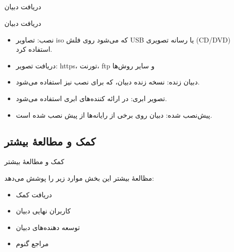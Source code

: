 \documentclass[hyperref={colorlinks}]{beamer}
\begin{document}
\begin{persian}
\section{}
\begin{frame}{دریافت دبیان}
\begin{block}{دریافت دبیان}
\begin{itemize}
\item 
نصب: تصاویر iso که می‌شود روی فلش USB یا رسانه تصویری (CD/DVD) استفاده کرد.

\item 
دریافت تصویر: https، تورنت، ftp و سایر روش‌ها
    
\item 
دبیان زنده: نسخه زنده دبیان، که برای نصب نیز استفاده می‌شود.

\item 
تصویر ابری: در ارائه کننده‌های ابری استفاده می‌شود.

\item
پیش‌نصب شده: دبیان روی برخی از رایانه‌ها از پیش نصب شده است.

\end{itemize}
\end{block}
\end{frame}
\end{persian}

\begin{persian}
\section{کمک و مطالعهٔ بیشتر}
\begin{frame}{کمک و مطالعهٔ بیشتر}
\begin{block}{مظالعهٔ بیشتر}
این بخش موارد زیر را پوشش می‌دهد:
	\begin{itemize}
		\item 
دریافت کمک
		\item 
کاربران نهایی دبیان
		\item 
توسعه دهنده‌های دبیان		
		\item 
مراجع گنوم
	\end{itemize}
\end{block}
\end{frame}
\end{persian}
\end{document}
